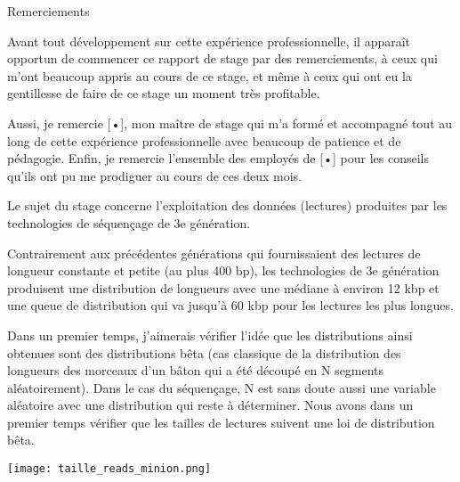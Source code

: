 \documentclass{book}
\begin{document}
Remerciements

Avant tout développement sur cette expérience professionnelle, il apparaît opportun de commencer ce rapport de stage par des remerciements, à ceux qui m’ont beaucoup appris au cours de ce stage, et même à ceux qui ont eu la gentillesse de faire de ce stage un moment très profitable.

Aussi, je remercie [•], mon maître de stage qui m’a formé et accompagné tout au long de cette expérience professionnelle avec beaucoup de patience et de pédagogie. Enfin, je remercie l’ensemble des employés de [•] pour les conseils qu’ils ont pu me prodiguer au cours de ces deux mois.


Le  sujet du stage concerne l'exploitation des données (lectures)
produites par les technologies de séquençage de 3e génération.

Contrairement aux précédentes générations qui fournissaient des lectures
de longueur constante et petite (au plus 400 bp), les technologies de 3e
génération produisent une distribution de longueurs avec une médiane à
environ 12 kbp et une queue de distribution qui va jusqu'à 60 kbp pour les
lectures les plus longues.

Dans un premier temps, j'aimerais vérifier l'idée que les distributions ainsi obtenues sont des distributions bêta (cas classique de la distribution
des longueurs des morceaux d'un bâton qui a été découpé en N segments
aléatoirement). Dans le cas du séquençage, N est sans doute aussi une
variable aléatoire avec une distribution qui reste à déterminer.
Nous avons dans un premier temps vérifier que les tailles de lectures suivent une loi de distribution bêta.

\texttt{[image: taille\_reads\_minion.png]} 
\end{document}
